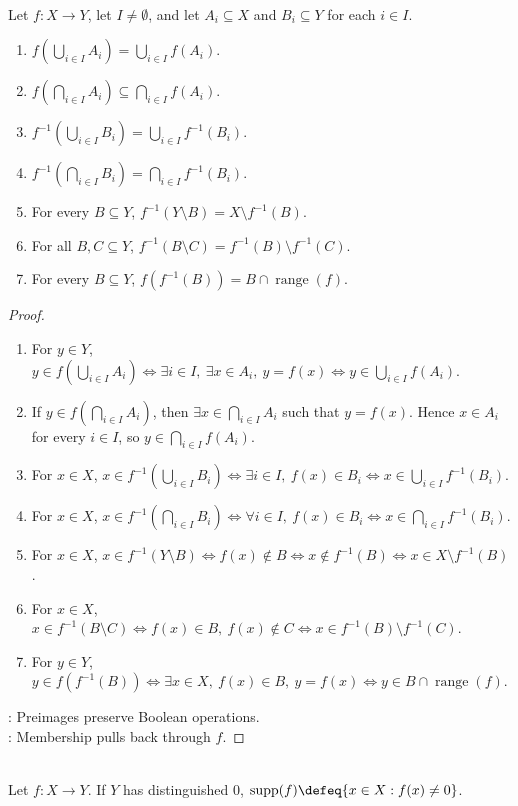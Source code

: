 \begin{proposition} \label{prop:image-preimage-calculus} \\
Let $f:X\to Y$, let $I\neq\emptyset$, and let $A_i\subseteq X$ and $B_i\subseteq Y$ for each $i\in I$.
\begin{enumerate}[label=(\roman*)]
\setlength{\itemsep}{0pt}
\item $f\left(\bigcup\limits_{i\in I}A_i\right)=\bigcup\limits_{i\in I}f(A_i)$.
\item $f\left(\bigcap\limits_{i\in I}A_i\right)\subseteq\bigcap\limits_{i\in I}f(A_i)$.
\item $f^{-1}\left(\bigcup\limits_{i\in I}B_i\right)=\bigcup\limits_{i\in I}f^{-1}(B_i)$.
\item $f^{-1}\left(\bigcap\limits_{i\in I}B_i\right)=\bigcap\limits_{i\in I}f^{-1}(B_i)$.
\item For every $B\subseteq Y$, $f^{-1}(Y\setminus B)=X\setminus f^{-1}(B)$.
\item For all $B,C\subseteq Y$, $f^{-1}(B\setminus C)=f^{-1}(B)\setminus f^{-1}(C)$.
\item For every $B\subseteq Y$, $f(f^{-1}(B))=B\cap\operatorname{range}(f)$.
\end{enumerate}
\begin{proof}
\begin{enumerate}[label=(\roman*)]
\setlength{\itemsep}{0pt}
\item For $y\in Y$, $y\in f\left(\bigcup\limits_{i\in I}A_i\right)\Longleftrightarrow\exists i\in I,\ \exists x\in A_i,\ y=f(x)\Longleftrightarrow y\in\bigcup\limits_{i\in I}f(A_i)$.
\item If $y\in f\left(\bigcap\limits_{i\in I}A_i\right)$, then $\exists x\in\bigcap\limits_{i\in I}A_i$ such that $y=f(x)$. Hence $x\in A_i$ for every $i\in I$, so $y\in\bigcap\limits_{i\in I}f(A_i)$.
\item For $x\in X$, $x\in f^{-1}\left(\bigcup\limits_{i\in I}B_i\right)\Longleftrightarrow\exists i\in I,\ f(x)\in B_i\Longleftrightarrow x\in\bigcup\limits_{i\in I}f^{-1}(B_i)$.
\item For $x\in X$, $x\in f^{-1}\left(\bigcap\limits_{i\in I}B_i\right)\Longleftrightarrow\forall i\in I,\ f(x)\in B_i\Longleftrightarrow x\in\bigcap\limits_{i\in I}f^{-1}(B_i)$.
\item For $x\in X$, $x\in f^{-1}(Y\setminus B)\Longleftrightarrow f(x)\notin B\Longleftrightarrow x\notin f^{-1}(B)\Longleftrightarrow x\in X\setminus f^{-1}(B)$.
\item For $x\in X$, $x\in f^{-1}(B\setminus C)\Longleftrightarrow f(x)\in B,\ f(x)\notin C\Longleftrightarrow x\in f^{-1}(B)\setminus f^{-1}(C)$.
\item For $y\in Y$, $y\in f(f^{-1}(B))\Longleftrightarrow\exists x\in X,\ f(x)\in B,\ y=f(x)\Longleftrightarrow y\in B\cap\operatorname{range}(f)$.
\end{enumerate}
: Preimages preserve Boolean operations.\\
: Membership pulls back through $f$.
\end{proof}
\end{proposition}

\begin{definition} \\
Let $f:X\to Y$. If $Y$ has distinguished $0$, $\operatorname{supp}(f)\defeq\{x\in X:f(x)\neq0\}$.
\end{definition}
